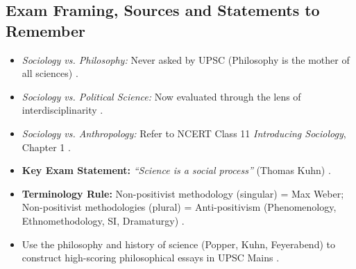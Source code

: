 \subsection{Exam Framing, Sources and Statements to Remember}
\begin{itemize}
    \item \textit{Sociology vs. Philosophy:} Never asked by UPSC (Philosophy is the mother of all sciences) .
    \item \textit{Sociology vs. Political Science:} Now evaluated through the lens of interdisciplinarity .
    \item \textit{Sociology vs. Anthropology:} Refer to NCERT Class 11 \textit{Introducing Sociology}, Chapter 1 .
    \item \textbf{Key Exam Statement:} \textit{``Science is a social process''} (Thomas Kuhn) .
    \item \textbf{Terminology Rule:} Non-positivist methodology (singular) = Max Weber; Non-positivist methodologies (plural) = Anti-positivism (Phenomenology, Ethnomethodology, SI, Dramaturgy) .
    \item Use the philosophy and history of science (Popper, Kuhn, Feyerabend) to construct high-scoring philosophical essays in UPSC Mains .
\end{itemize}